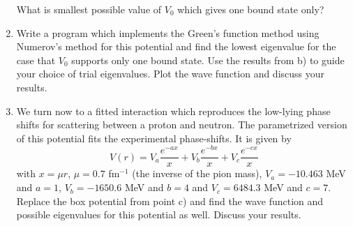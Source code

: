 \begin{prob}
\begin{enumerate}
What is smallest possible value of $V_0$ which  gives one bound state only? 

\item  Write a program which implements the Green's function method using Numerov's method
for this potential
and find the lowest eigenvalue for the case that $V_0$ supports only one bound state.
Use the results from b) to guide your choice of trial eigenvalues.
Plot the wave function and discuss your results. 

\item
We turn now to a fitted interaction which reproduces the low-lying phase shifts
for scattering
between a proton and neutron.
The parametrized version of this potential fits the experimental
phase-shifts. It is given by
\begin{equation}
  V(r)=V_a \frac{e^{-ax}}{x}+V_b \frac{e^{-bx}}{x}+V_c \frac{e^{-cx}}{x}
  \label{eq:realp}
\end{equation}
with $x=\mu r$, $\mu=0.7$ fm$^{-1}$ (the inverse of the pion mass),
$V_a=-10.463$ MeV and $a=1$, $V_b=-1650.6$ MeV and $b=4$ and
$V_c=6484.3$ MeV and $c=7$. 
Replace the box potential from point c) and find the wave function and possible eigenvalues
for this potential as well. Discuss your results.

\end{enumerate}

\end{prob}






